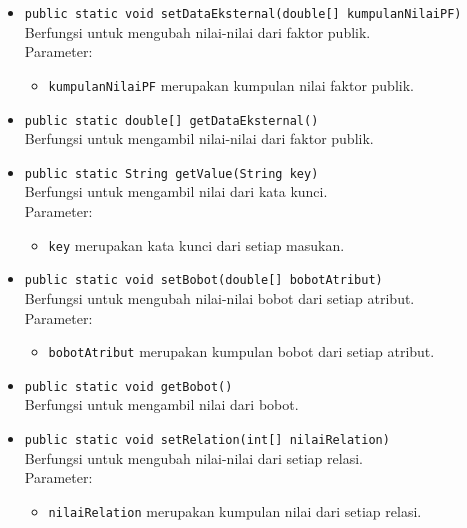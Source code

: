 \begin{itemize}
		\item \texttt{public static void setDataEksternal(double[] kumpulanNilaiPF)}\\
		Berfungsi untuk mengubah nilai-nilai dari faktor publik.\\
		Parameter:
		\begin{itemize}
			\item \texttt{kumpulanNilaiPF} merupakan kumpulan nilai faktor publik.
		\end{itemize}
		
		\item \texttt{public static double[] getDataEksternal()}\\
		Berfungsi untuk mengambil nilai-nilai dari faktor publik.
		
		\item \texttt{public static String getValue(String key)}\\
		Berfungsi untuk mengambil nilai dari kata kunci.\\
		Parameter:
		\begin{itemize}
			\item \texttt{key} merupakan kata kunci dari setiap masukan.
		\end{itemize}
		
		\item \texttt{public static void setBobot(double[] bobotAtribut)}\\
		Berfungsi untuk mengubah nilai-nilai bobot dari setiap atribut.\\
		Parameter:
		\begin{itemize}
			\item \texttt{bobotAtribut} merupakan kumpulan bobot dari setiap atribut.
		\end{itemize}
		
		\item \texttt{public static void getBobot()}\\
		Berfungsi untuk mengambil nilai dari bobot.
		
		\item \texttt{public static void setRelation(int[] nilaiRelation)}\\
		Berfungsi untuk mengubah nilai-nilai dari setiap relasi.\\
		Parameter:
		\begin{itemize}
			\item \texttt{nilaiRelation} merupakan kumpulan nilai dari setiap relasi.
		\end{itemize}
		

\end{itemize}
